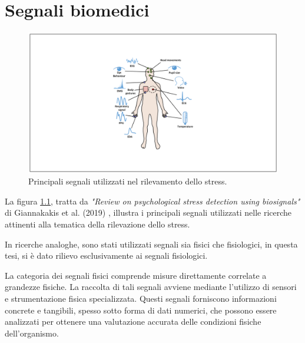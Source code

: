 \pagestyle{fancy}

\fancyhf{}

\fancyfoot[C]{\thepage}


\chapter{Segnali biomedici}

\begin{figure}[t]
    \centering
    \includegraphics[width=\linewidth]{img//3/1.png}
    \caption{Principali segnali utilizzati nel rilevamento dello stress.}
    \label{fig:3-1}
\end{figure}

La figura \ref{fig:3-1}, tratta da \textit{"Review on psychological stress detection using biosignals"} di Giannakakis et al. (2019) \cite{giannakakis2019review}, illustra i principali segnali utilizzati nelle ricerche attinenti alla tematica della rilevazione dello stress.

\bigskip

In ricerche analoghe, sono stati utilizzati segnali sia fisici che fisiologici, in questa tesi, si è dato rilievo esclusivamente ai segnali fisiologici.

\bigskip

La categoria dei segnali fisici comprende misure direttamente correlate a grandezze fisiche. La raccolta di tali segnali avviene mediante l'utilizzo di sensori e strumentazione fisica specializzata. Questi segnali forniscono informazioni concrete e tangibili, spesso sotto forma di dati numerici, che possono essere analizzati per ottenere una valutazione accurata delle condizioni fisiche dell'organismo.

